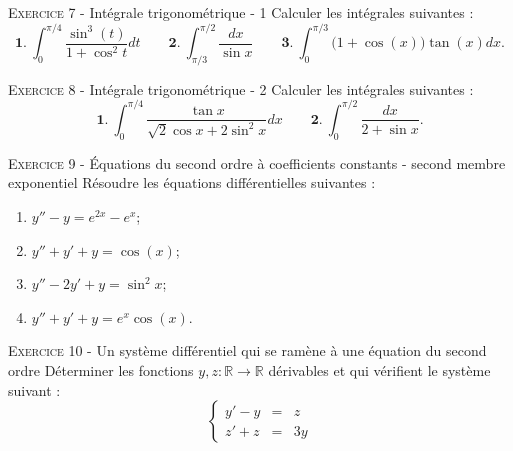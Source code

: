 \documentclass[11pt]{article}
\begin{document}


\vskip0.3cm\noindent\textsc{Exercice 7} - Intégrale trigonométrique - 1
\vskip0.2cm
Calculer les intégrales suivantes :
$$\mathbf{1.}\ \int_0^{\pi/4}\frac{\sin^3(t)}{1+\cos^2 t}dt\quad\quad\mathbf{2.}\ \int_{\pi/3}^{\pi/2}\frac{dx}{\sin x}\quad\quad\mathbf{3.}\ \int_0^{\pi/3}\big(1+\cos(x)\big)\tan(x)dx.$$




\vskip0.3cm\noindent\textsc{Exercice 8} - Intégrale trigonométrique - 2
\vskip0.2cm
Calculer les intégrales suivantes :
$$\mathbf{1.}\ \int_0^{\pi/4}\frac{\tan x}{\sqrt 2\cos x+2\sin^2 x}dx\quad\quad\mathbf{2.}\ \int_0^{\pi/2}\frac{dx}{2+\sin x}.$$




\vskip0.3cm\noindent\textsc{Exercice 9} - \'Equations du second ordre à coefficients constants - second membre exponentiel
\vskip0.2cm
Résoudre les équations différentielles suivantes :
\begin{enumerate}
\item $y''-y=e^{2x}-e^x$;
\item $y''+y'+y=\cos(x)$;
\item $y''-2y'+y=\sin^2 x$;
\item $y''+y'+y=e^x\cos(x)$.
\end{enumerate}




\vskip0.3cm\noindent\textsc{Exercice 10} - Un système différentiel qui se ramène à une équation du second ordre
\vskip0.2cm
Déterminer les fonctions $y,z:\mathbb R\to\mathbb R$ dérivables et qui vérifient le système suivant :
$$
\left\{
\begin{array}{rcl}
y'-y&=&z\\
z'+z&=&3y
\end{array}
\right.$$


\end{document}
